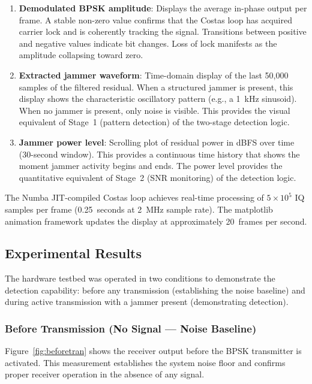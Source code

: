 \documentclass{article}
\begin{document}
\begin{enumerate}
\item \textbf{Demodulated BPSK amplitude}: Displays the average in-phase output per frame. A stable non-zero value confirms that the Costas loop has acquired carrier lock and is coherently tracking the signal. Transitions between positive and negative values indicate bit changes. Loss of lock manifests as the amplitude collapsing toward zero.
\item \textbf{Extracted jammer waveform}: Time-domain display of the last 50,000 samples of the filtered residual. When a structured jammer is present, this display shows the characteristic oscillatory pattern (e.g., a 1~kHz sinusoid). When no jammer is present, only noise is visible. This provides the visual equivalent of Stage~1 (pattern detection) of the two-stage detection logic.
\item \textbf{Jammer power level}: Scrolling plot of residual power in dBFS over time (30-second window). This provides a continuous time history that shows the moment jammer activity begins and ends. The power level provides the quantitative equivalent of Stage~2 (SNR monitoring) of the detection logic.
\end{enumerate}

The Numba JIT-compiled Costas loop achieves real-time processing of $5 \times 10^5$ IQ samples per frame (0.25~seconds at 2~MHz sample rate). The matplotlib animation framework updates the display at approximately 20~frames per second.

\subsection{Experimental Results}

The hardware testbed was operated in two conditions to demonstrate the detection capability: before any transmission (establishing the noise baseline) and during active transmission with a jammer present (demonstrating detection).

\subsubsection{Before Transmission (No Signal — Noise Baseline)}

Figure~\ref{fig:beforetran} shows the receiver output before the BPSK transmitter is activated. This measurement establishes the system noise floor and confirms proper receiver operation in the absence of any signal.
\end{document}
